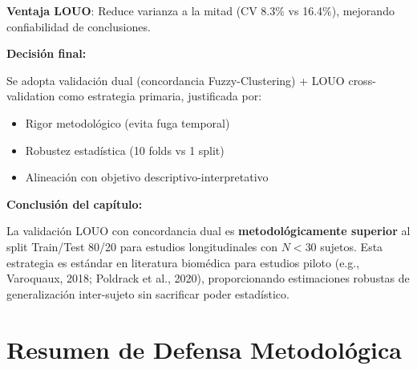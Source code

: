 \documentclass[12pt,letterpaper,twoside]{report}
\begin{document}
\begin{calculobox}
\begin{calculobox}
\textbf{Ventaja LOUO}: Reduce varianza a la mitad (CV 8.3\% vs 16.4\%), mejorando confiabilidad de conclusiones.
\end{calculobox}

\begin{decisionbox}
\textbf{Decisión final:}

Se adopta validación dual (concordancia Fuzzy-Clustering) + LOUO cross-validation como estrategia primaria, justificada por:
\begin{itemize}[noitemsep]
    \item Rigor metodológico (evita fuga temporal)
    \item Robustez estadística (10 folds vs 1 split)
    \item Alineación con objetivo descriptivo-interpretativo
\end{itemize}
\end{decisionbox}

\begin{conclusionbox}
\textbf{Conclusión del capítulo:}

La validación LOUO con concordancia dual es \textbf{metodológicamente superior} al split Train/Test 80/20 para estudios longitudinales con $N < 30$ sujetos. Esta estrategia es estándar en literatura biomédica para estudios piloto (e.g., Varoquaux, 2018; Poldrack et al., 2020), proporcionando estimaciones robustas de generalización inter-sujeto sin sacrificar poder estadístico.
\end{conclusionbox}

\section{Resumen de Defensa Metodológica}

\begin{table}[H]
\centering
\caption{Comparación de Estrategias de Validación}
\label{tab:validation_comparison}
\end{table}


\end{calculobox}
\end{document}
